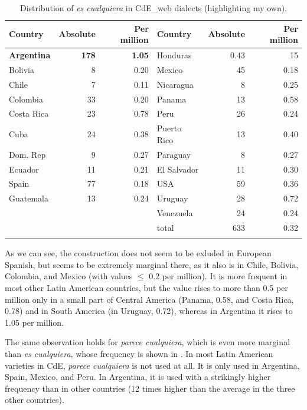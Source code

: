\begin{table}
\begin{tabularx}{\textwidth}{lrr Xrr}
    \lsptoprule
    Country & Absolute & Per million & Country & Absolute & Per million\\
\midrule
  \textbf{Argentina} &  \textbf{178} &  \textbf{1.05}     &    Honduras &  0.43 &   15      \\
  Bolivia &8 &  0.20       &    Mexico & 45& 0.18        \\
  Chile &   7 &  0.11           &    Nicaragua &    8 &  0.25    \\
  Colombia & 33       &  0.20 &      Panama &   13  & 0.58      \\
  Costa Rica &   23     & 0.78 &      Peru &   26 &  0.24        \\
  Cuba &    24 &  0.38          &    Puerto Rico &    13 & 0.40  \\
  Dom. Rep &   9       & 0.27 &      Paraguay &   8   & 0.27    \\
  Ecuador &  11        &  0.21 &     El Salvador &    11 & 0.30    \\
  Spain &  77          &   0.18 &   USA &     59  &  0.36       \\
  Guatemala &  13      &  0.24 &     Uruguay &  28   & 0.72      \\
            &        &          &    Venezuela &   24 & 0.24     \\
\midrule
           &           &       &  {total} &    {633} &  {0.32}           \\
  \lspbottomrule
\end{tabularx}
\caption{\label{tab:key:8} Distribution of \textit{es cualquiera} in CdE\_web dialects (highlighting my own).} %
\end{table}

As we can see, the construction does not seem to be exluded in European Spanish, but seems to be extremely marginal there, as it also is in Chile, Bolivia, Colombia, and Mexico (with values ${\leq}$ 0.2 per million). It is more frequent in most other Latin American countries, but the value rises to more than 0.5 per million only in a small part of Central America (Panama, 0.58, and Costa Rica, 0.78) and in South America (in Uruguay, 0.72), whereas in Argentina it rises to 1.05 per million.

The same observation holds for \textit{parece cualquiera}, which is even more marginal than \textit{es cualquiera}, whose frequency is shown in . In most Latin American varieties in CdE, \textit{parece cualquiera} is not used at all. It is only used in Argentina, Spain, Mexico, and Peru. In Argentina, it is used with a strikingly higher frequency than in other countries (12 times higher than the average in the three other countries).


